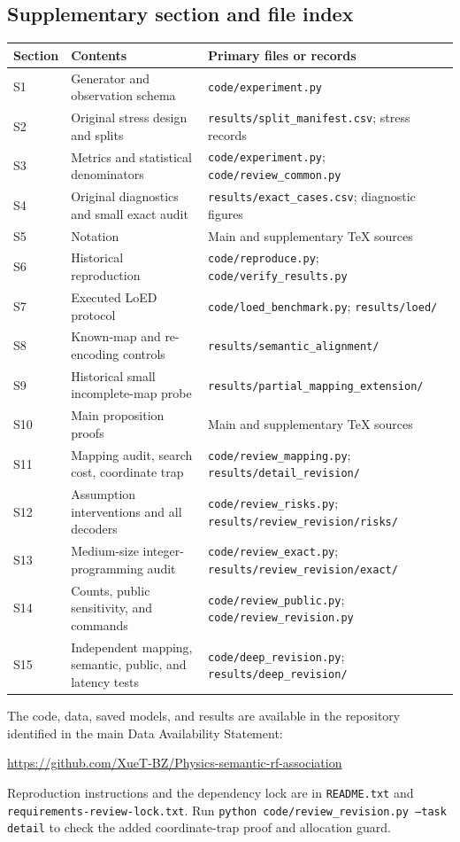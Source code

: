 \documentclass[10pt,a4paper]{article}
\begin{document}
\subsection{Supplementary section and file index}
\begin{center}\small
\begin{tabularx}{\linewidth}{@{}lY>{\raggedright\arraybackslash}p{6.2cm}@{}}\toprule
Section & Contents & Primary files or records\\\midrule
S1 & Generator and observation schema & \texttt{code/experiment.py}\\
S2 & Original stress design and splits & \texttt{results/split\_manifest.csv}; stress records\\
S3 & Metrics and statistical denominators & \texttt{code/experiment.py}; \texttt{code/review\_common.py}\\
S4 & Original diagnostics and small exact audit & \texttt{results/exact\_cases.csv}; diagnostic figures\\
S5 & Notation & Main and supplementary TeX sources\\
S6 & Historical reproduction & \texttt{code/reproduce.py}; \texttt{code/verify\_results.py}\\
S7 & Executed LoED protocol & \texttt{code/loed\_benchmark.py}; \texttt{results/loed/}\\
S8 & Known-map and re-encoding controls & \texttt{results/semantic\_alignment/}\\
S9 & Historical small incomplete-map probe & \texttt{results/partial\_mapping\_extension/}\\
S10 & Main proposition proofs & Main and supplementary TeX sources\\
S11 & Mapping audit, search cost, coordinate trap & \texttt{code/review\_mapping.py}; \texttt{results/detail\_revision/}\\
S12 & Assumption interventions and all decoders & \texttt{code/review\_risks.py}; \texttt{results/review\_revision/risks/}\\
S13 & Medium-size integer-programming audit & \texttt{code/review\_exact.py}; \texttt{results/review\_revision/exact/}\\
S14 & Counts, public sensitivity, and commands & \texttt{code/review\_public.py}; \texttt{code/review\_revision.py}\\
S15 & Independent mapping, semantic, public, and latency tests & \texttt{code/deep\_revision.py}; \texttt{results/deep\_revision/}\\\bottomrule
\end{tabularx}\end{center}
\normalsize
The code, data, saved models, and results are available in the repository identified in the main Data Availability Statement:
\begin{center}\url{https://github.com/XueT-BZ/Physics-semantic-rf-association}\end{center}
Reproduction instructions and the dependency lock are in \texttt{README.txt} and \texttt{requirements-review-lock.txt}. Run \texttt{python code/review\_revision.py --task detail} to check the added coordinate-trap proof and allocation guard.


\end{document}
